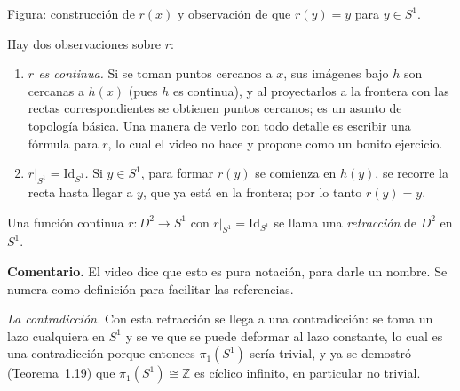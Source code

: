 \documentclass[11pt]{article}
\begin{document}
\begin{center}
\end{center}

\noindent Figura: construcción de $r(x)$ y observación de que $r(y)=y$ para $y\in S^1$.

Hay dos observaciones sobre $r$:
\begin{enumerate}
  \item \emph{$r$ es continua.} Si se toman puntos cercanos a $x$, sus imágenes bajo $h$ son cercanas a $h(x)$ (pues $h$ es continua), y al proyectarlos a la frontera con las rectas correspondientes se obtienen puntos cercanos; es un asunto de topología básica. Una manera de verlo con todo detalle es escribir una fórmula para $r$, lo cual el video no hace y propone como un bonito ejercicio.
  \item \emph{$r|_{S^1}=\mathrm{Id}_{S^1}$.} Si $y\in S^1$, para formar $r(y)$ se comienza en $h(y)$, se recorre la recta hasta llegar a $y$, que ya está en la frontera; por lo tanto $r(y)=y$.
\end{enumerate}

\begin{defn}[retracción]
Una función continua $r\colon D^2\to S^1$ con $r|_{S^1}=\mathrm{Id}_{S^1}$ se llama una \emph{retracción} de $D^2$ en $S^1$.
\end{defn}

\noindent\textbf{Comentario.} El video dice que esto es pura notación, para darle un nombre. Se numera como definición para facilitar las referencias.

\medskip\noindent\textit{La contradicción.}
Con esta retracción se llega a una contradicción: se toma un lazo cualquiera en $S^1$ y se ve que se puede deformar al lazo constante, lo cual es una contradicción porque entonces $\pi_1(S^1)$ sería trivial, y ya se demostró (Teorema~1.19) que $\pi_1(S^1)\cong\mathbb{Z}$ es cíclico infinito, en particular no trivial.
\end{document}
